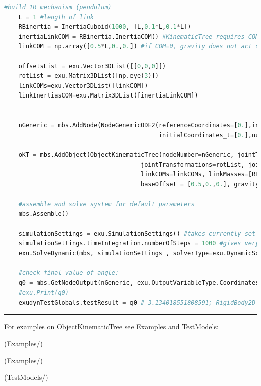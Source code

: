 \begin{lstlisting}[language=Python, firstnumber=1]
    #build 1R mechanism (pendulum)
    L = 1 #length of link
    RBinertia = InertiaCuboid(1000, [L,0.1*L,0.1*L])
    inertiaLinkCOM = RBinertia.InertiaCOM() #KinematicTree requires COM inertia
    linkCOM = np.array([0.5*L,0.,0.]) #if COM=0, gravity does not act on pendulum!

    offsetsList = exu.Vector3DList([[0,0,0]])
    rotList = exu.Matrix3DList([np.eye(3)])
    linkCOMs=exu.Vector3DList([linkCOM])
    linkInertiasCOM=exu.Matrix3DList([inertiaLinkCOM])
    
    
    nGeneric = mbs.AddNode(NodeGenericODE2(referenceCoordinates=[0.],initialCoordinates=[0.],
                                           initialCoordinates_t=[0.],numberOfODE2Coordinates=1))

    oKT = mbs.AddObject(ObjectKinematicTree(nodeNumber=nGeneric, jointTypes=[exu.JointType.RevoluteZ], linkParents=[-1],
                                      jointTransformations=rotList, jointOffsets=offsetsList, linkInertiasCOM=linkInertiasCOM,
                                      linkCOMs=linkCOMs, linkMasses=[RBinertia.mass], 
                                      baseOffset = [0.5,0.,0.], gravity=[0.,-9.81,0.]))

    #assemble and solve system for default parameters
    mbs.Assemble()
    
    simulationSettings = exu.SimulationSettings() #takes currently set values or default values
    simulationSettings.timeIntegration.numberOfSteps = 1000 #gives very accurate results
    exu.SolveDynamic(mbs, simulationSettings , solverType=exu.DynamicSolverType.RK67) #highly accurate!

    #check final value of angle:
    q0 = mbs.GetNodeOutput(nGeneric, exu.OutputVariableType.Coordinates)
    #exu.Print(q0)
    exudynTestGlobals.testResult = q0 #-3.134018551808591; RigidBody2D with 2e6 time steps gives: -3.134018551809384

\end{lstlisting}

\vspace{6pt}\par\noindent\rule{\textwidth}{0.4pt}
%
\noindent For examples on ObjectKinematicTree see Examples and TestModels:
\bi
\item {} (Examples/)
\item {} (Examples/)
\item {} (TestModels/)
\ei

